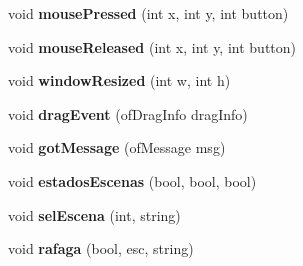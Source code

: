 \begin{DoxyCompactItemize}
\item 
\hypertarget{classof_app_a2c2ea9c160231e55424dfd98466ef27d}{}void {\bfseries mouse\+Pressed} (int x, int y, int button)\label{classof_app_a2c2ea9c160231e55424dfd98466ef27d}

\item 
\hypertarget{classof_app_aa3131f1554fc49eaa9ee0f284e48129b}{}void {\bfseries mouse\+Released} (int x, int y, int button)\label{classof_app_aa3131f1554fc49eaa9ee0f284e48129b}

\item 
\hypertarget{classof_app_ae4dc1ec1513dcbe48bc78a5e4c3fac0f}{}void {\bfseries window\+Resized} (int w, int h)\label{classof_app_ae4dc1ec1513dcbe48bc78a5e4c3fac0f}

\item 
\hypertarget{classof_app_aada5a79556321801567752a0e5a69bda}{}void {\bfseries drag\+Event} (of\+Drag\+Info drag\+Info)\label{classof_app_aada5a79556321801567752a0e5a69bda}

\item 
\hypertarget{classof_app_a885672a72340a5e998af1d16718dc766}{}void {\bfseries got\+Message} (of\+Message msg)\label{classof_app_a885672a72340a5e998af1d16718dc766}

\item 
\hypertarget{classof_app_aa2a2572523fa300395395b1a7ec88e05}{}void {\bfseries estados\+Escenas} (bool, bool, bool)\label{classof_app_aa2a2572523fa300395395b1a7ec88e05}

\item 
\hypertarget{classof_app_a7fd7984af79ba9ba02726836cf6740df}{}void {\bfseries sel\+Escena} (int, string)\label{classof_app_a7fd7984af79ba9ba02726836cf6740df}

\item 
\hypertarget{classof_app_a7cc13ef3c1a4af65991a1bfd348de7fb}{}void {\bfseries rafaga} (bool, esc, string)\label{classof_app_a7cc13ef3c1a4af65991a1bfd348de7fb}

\end{DoxyCompactItemize}
